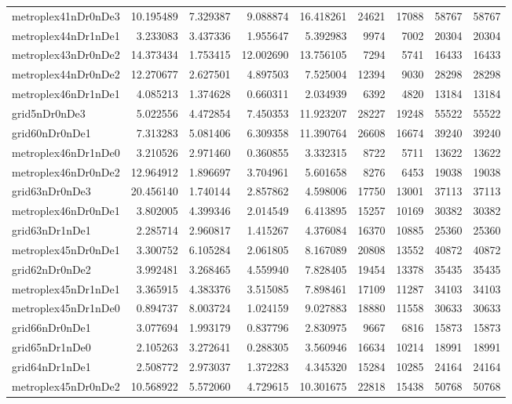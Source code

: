 \begin{longtable}{|l|r|r|r|r|r|r|r|r|}
metroplex41nDr0nDe3 & 10.195489 & 7.329387 & 9.088874 & 16.418261 & 24621 & 17088 & 58767 & 58767 \\
metroplex44nDr1nDe1 & 3.233083 & 3.437336 & 1.955647 & 5.392983 & 9974 & 7002 & 20304 & 20304 \\
metroplex43nDr0nDe2 & 14.373434 & 1.753415 & 12.002690 & 13.756105 & 7294 & 5741 & 16433 & 16433 \\
metroplex44nDr0nDe2 & 12.270677 & 2.627501 & 4.897503 & 7.525004 & 12394 & 9030 & 28298 & 28298 \\
metroplex46nDr1nDe1 & 4.085213 & 1.374628 & 0.660311 & 2.034939 & 6392 & 4820 & 13184 & 13184 \\
grid5nDr0nDe3 & 5.022556 & 4.472854 & 7.450353 & 11.923207 & 28227 & 19248 & 55522 & 55522 \\
grid60nDr0nDe1 & 7.313283 & 5.081406 & 6.309358 & 11.390764 & 26608 & 16674 & 39240 & 39240 \\
metroplex46nDr1nDe0 & 3.210526 & 2.971460 & 0.360855 & 3.332315 & 8722 & 5711 & 13622 & 13622 \\
metroplex46nDr0nDe2 & 12.964912 & 1.896697 & 3.704961 & 5.601658 & 8276 & 6453 & 19038 & 19038 \\
grid63nDr0nDe3 & 20.456140 & 1.740144 & 2.857862 & 4.598006 & 17750 & 13001 & 37113 & 37113 \\
metroplex46nDr0nDe1 & 3.802005 & 4.399346 & 2.014549 & 6.413895 & 15257 & 10169 & 30382 & 30382 \\
grid63nDr1nDe1 & 2.285714 & 2.960817 & 1.415267 & 4.376084 & 16370 & 10885 & 25360 & 25360 \\
metroplex45nDr0nDe1 & 3.300752 & 6.105284 & 2.061805 & 8.167089 & 20808 & 13552 & 40872 & 40872 \\
grid62nDr0nDe2 & 3.992481 & 3.268465 & 4.559940 & 7.828405 & 19454 & 13378 & 35435 & 35435 \\
metroplex45nDr1nDe1 & 3.365915 & 4.383376 & 3.515085 & 7.898461 & 17109 & 11287 & 34103 & 34103 \\
metroplex45nDr1nDe0 & 0.894737 & 8.003724 & 1.024159 & 9.027883 & 18880 & 11558 & 30633 & 30633 \\
grid66nDr0nDe1 & 3.077694 & 1.993179 & 0.837796 & 2.830975 & 9667 & 6816 & 15873 & 15873 \\
grid65nDr1nDe0 & 2.105263 & 3.272641 & 0.288305 & 3.560946 & 16634 & 10214 & 18991 & 18991 \\
grid64nDr1nDe1 & 2.508772 & 2.973037 & 1.372283 & 4.345320 & 15284 & 10285 & 24164 & 24164 \\
metroplex45nDr0nDe2 & 10.568922 & 5.572060 & 4.729615 & 10.301675 & 22818 & 15438 & 50768 & 50768 \\

\end{longtable}
